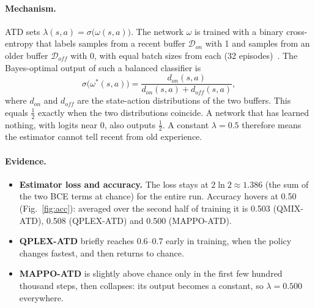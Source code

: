 \paragraph{Mechanism.} ATD sets $\lambda(s,a)=\sigma\bigl(\omega(s,a)\bigr)$. The network $\omega$
is trained with a binary cross-entropy that labels samples from a recent buffer
$\mathcal{D}_{on}$ with 1 and samples from an older buffer $\mathcal{D}_{off}$ with 0, with equal
batch sizes from each (32 episodes)~\citep{deng2026adaptive}. The Bayes-optimal output of such a
balanced classifier is
\begin{equation}
  \sigma\bigl(\omega^\ast(s,a)\bigr) = \frac{d_{on}(s,a)}{d_{on}(s,a)+d_{off}(s,a)} ,
\end{equation}
where $d_{on}$ and $d_{off}$ are the state-action distributions of the two buffers. This equals
$\tfrac12$ exactly when the two distributions coincide. A network that has learned nothing, with
logits near 0, also outputs $\tfrac12$. A constant $\lambda=0.5$ therefore means the estimator
cannot tell recent from old experience.

\paragraph{Evidence.}
\begin{itemize}
  \item \textbf{Estimator loss and accuracy.} The loss stays at
        $2\ln2\approx1.386$ (the sum of the two BCE terms at chance) for the entire run.
        Accuracy hovers at 0.50 (Fig.~\ref{fig:acc}): averaged over the second half of
        training it is 0.503 (QMIX-ATD), 0.508 (QPLEX-ATD) and 0.500 (MAPPO-ATD).
  \item \textbf{QPLEX-ATD} briefly reaches 0.6--0.7 early in training, when the policy changes
        fastest, and then returns to chance.
  \item \textbf{MAPPO-ATD} is slightly above chance only in the first few hundred thousand steps,
        then collapses: its output becomes a constant, so $\lambda=0.500$ everywhere.
\end{itemize}

